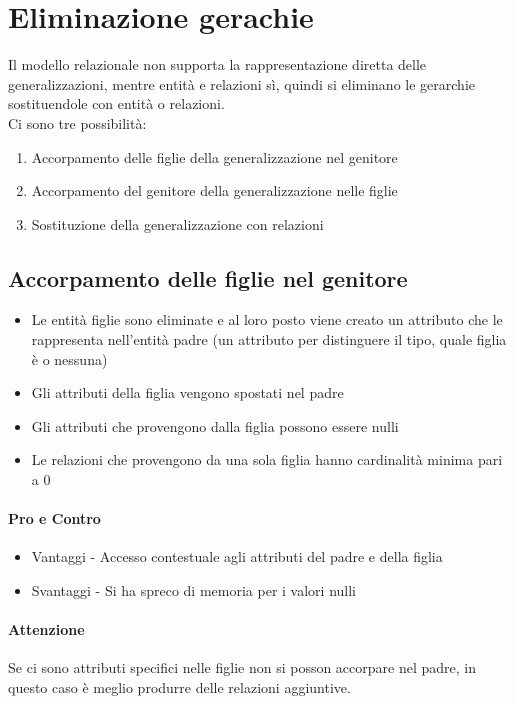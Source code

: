 \section{Eliminazione gerachie}
Il modello relazionale non supporta la rappresentazione diretta delle generalizzazioni,
mentre entità e relazioni sì, quindi si eliminano le gerarchie sostituendole con 
entità o relazioni.\\
Ci sono tre possibilità:
\begin{enumerate}
    \item Accorpamento delle figlie della generalizzazione nel genitore
    \item Accorpamento del genitore della generalizzazione nelle figlie
    \item Sostituzione della generalizzazione con relazioni
\end{enumerate}
\subsection{Accorpamento delle figlie nel genitore}
\begin{itemize}
    \item Le entità figlie sono eliminate e al loro posto viene creato un attributo che le rappresenta
    nell'entità padre (un attributo per distinguere il tipo, quale figlia è o nessuna)
    \item Gli attributi della figlia vengono spostati nel padre
    \item Gli attributi che  provengono dalla figlia possono essere nulli
    \item Le relazioni che provengono da una sola figlia hanno cardinalità minima pari a 0
\end{itemize}
\paragraph*{Pro e Contro}
\begin{itemize}
    \item Vantaggi - Accesso contestuale agli attributi del padre e della figlia
    \item Svantaggi - Si ha spreco di memoria per i valori nulli
\end{itemize}
\paragraph*{Attenzione} Se ci sono attributi specifici nelle figlie non si posson
accorpare nel padre, in questo caso è meglio produrre delle relazioni aggiuntive.
